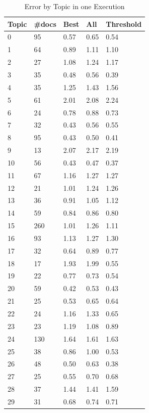 \documentclass{acm_proc_article-sp}
\begin{document}
\begin{table}[h]
\centering
\label{errortopic}
\caption{Error by Topic in one Execution}
\begin{tabular}{lllll}\hline
Topic & \#docs & Best & All    & Threshold     \\ \hline \hline
0     & 95    & 0.57  & 0.65 & 0.54 \\
1      & 64    & 0.89 & 1.11 & 1.10 \\
2      & 27    & 1.08 & 1.24 & 1.17 \\
3      & 35    & 0.48 & 0.56 & 0.39 \\
4      & 35    & 1.25 & 1.43 & 1.56 \\
5      & 61    & 2.01 & 2.08 & 2.24 \\
6      & 24    & 0.78 & 0.88 & 0.73 \\
7      & 32    & 0.43 & 0.56 & 0.55 \\
8      & 95    & 0.43 & 0.50 & 0.41 \\
9      & 13    & 2.07 & 2.17 & 2.19 \\
10     & 56    & 0.43 & 0.47 & 0.37 \\
11     & 67    & 1.16 & 1.27 & 1.27 \\
12     & 21    & 1.01 & 1.24 & 1.26 \\
13     & 36    & 0.91 & 1.05 & 1.12 \\
14     & 59    & 0.84 & 0.86 & 0.80 \\
15     & 260   & 1.01 & 1.26 & 1.11 \\
16     & 93    & 1.13 & 1.27 & 1.30 \\
17     & 32    & 0.64 & 0.89 & 0.77 \\
18     & 17    & 1.93 & 1.99 & 0.55 \\
19     & 22    & 0.77 & 0.73 & 0.54 \\
20     & 59    & 0.42 & 0.53 & 0.43 \\
21     & 25    & 0.53 & 0.65 & 0.64 \\
22     & 24    & 1.16 & 1.33 & 0.65 \\
23     & 23    & 1.19 & 1.08 & 0.89 \\
24     & 130   & 1.64 & 1.61 & 1.63 \\
25     & 38    & 0.86 & 1.00 & 0.53 \\
26     & 48    & 0.50 & 0.63 & 0.38 \\
27     & 25    & 0.55 & 0.70 & 0.68 \\
28     & 37    & 1.44 & 1.41 & 1.59 \\
29     & 31    & 0.68 & 0.74 & 0.71 \\ \hline
\end{tabular}
\end{table}
\end{document}
